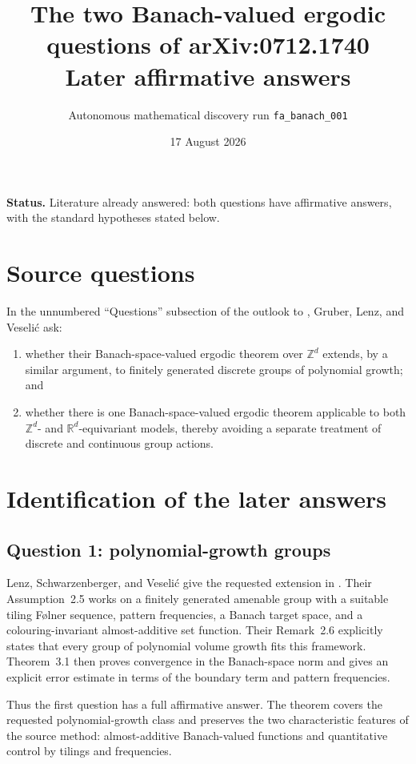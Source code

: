 \documentclass[11pt]{article}
\title{The two Banach-valued ergodic questions of arXiv:0712.1740\\
\large Later affirmative answers}
\author{Autonomous mathematical discovery run \texttt{fa\_banach\_001}}
\date{17 August 2026}
\begin{document}
\maketitle

\noindent\textbf{Status.}
Literature already answered: both questions have affirmative answers, with
the standard hypotheses stated below.

\section{Source questions}

In the unnumbered ``Questions'' subsection of the outlook to
\cite[PDF pp.~19--20]{GLV}, Gruber, Lenz, and Veseli\'c ask:
\begin{enumerate}
\item whether their Banach-space-valued ergodic theorem over $\mathbb Z^d$
extends, by a similar argument, to finitely generated discrete groups of
polynomial growth; and
\item whether there is one Banach-space-valued ergodic theorem applicable to
both $\mathbb Z^d$- and $\mathbb R^d$-equivariant models, thereby avoiding a
separate treatment of discrete and continuous group actions.
\end{enumerate}

\section{Identification of the later answers}

\subsection*{Question 1: polynomial-growth groups}

Lenz, Schwarzenberger, and Veseli\'c give the requested extension in
\cite{LSV}.  Their Assumption~2.5 works on a finitely generated amenable group
with a suitable tiling F\o lner sequence, pattern frequencies, a Banach target
space, and a colouring-invariant almost-additive set function.  Their
Remark~2.6 explicitly states that every group of polynomial volume growth fits
this framework.  Theorem~3.1 then proves convergence in the Banach-space norm
and gives an explicit error estimate in terms of the boundary term and pattern
frequencies.

Thus the first question has a full affirmative answer.  The theorem covers
the requested polynomial-growth class and preserves the two characteristic
features of the source method: almost-additive Banach-valued functions and
quantitative control by tilings and frequencies.
\end{document}
